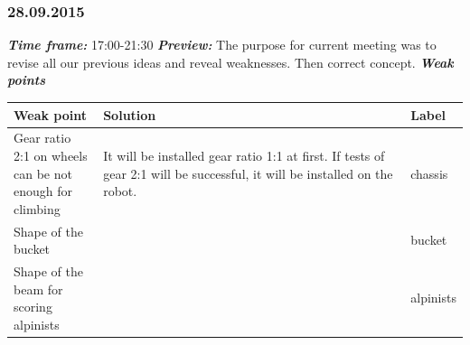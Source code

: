 \subsubsection{28.09.2015}
	\textit{\textbf{Time frame:}} 17:00-21:30 \newline
	\textit{\textbf{Preview:}} The purpose for current meeting was to revise all our previous ideas and reveal weaknesses. Then correct concept.\newline \newline
	\textit{\textbf{Weak points}}

  \begin{table}[H]
	\vspace{-2mm}
	\begin{center}
		\begin{tabular}{|p{0.2\linewidth}|p{0.7\linewidth}|p{0.1\linewidth}|}
			\hline
			Weak point & Solution & Label \\
			\hline
			Gear ratio 2:1 on wheels can be not enough for climbing & It will be installed gear ratio 1:1 at first. If tests of gear 2:1 will be successful, it will be installed on the robot. & chassis \\
			\hline
			Shape of the bucket &  & bucket \\
			\hline
			Shape of the beam for scoring alpinists &  & alpinists \\
			\hline
		\end{tabular}
	\end{center}
  \end{table}
  
